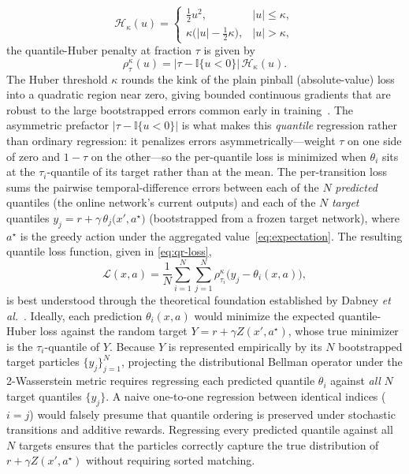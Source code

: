 \documentclass{ieeetmlcn}
\begin{document}
\begin{equation}
\mathcal{H}_\kappa(u) =
\begin{cases}
\tfrac12 u^2, & |u|\le\kappa,\\[2pt]
\kappa\big(|u|-\tfrac12\kappa\big), & |u|>\kappa,
\end{cases}
\end{equation}
the quantile-Huber penalty at fraction $\tau$ is given by
\begin{equation}
\rho^\kappa_\tau(u) = \big|\tau - \mathbb{I}\{u<0\}\big|\,
\mathcal{H}_\kappa(u).
\label{eq:pinball}
\end{equation}
The Huber threshold $\kappa$ rounds the kink of the plain pinball
(absolute-value) loss into a quadratic region near zero, giving bounded
continuous gradients that are robust to the large bootstrapped errors common
early in training~\cite{qrdqn}. The asymmetric prefactor
$|\tau-\mathbb{I}\{u<0\}|$ is what makes this \emph{quantile} regression rather
than ordinary regression: it penalizes errors asymmetrically---weight $\tau$ on
one side of zero and $1-\tau$ on the other---so the per-quantile loss is minimized
when $\theta_i$ sits at the $\tau_i$-quantile of its target rather than at the
mean.
The per-transition loss sums the pairwise temporal-difference errors between
each of the $N$ \emph{predicted} quantiles (the online network's current outputs)
and each of the $N$ \emph{target} quantiles
$y_j = r + \gamma\,\theta_j\!\big(x',a^\star\big)$ (bootstrapped from a frozen
target network), where $a^\star$ is the greedy action under the aggregated value~\eqref{eq:expectation}. The resulting quantile loss function, given in \eqref{eq:qr-loss},
\begin{equation}
\mathcal{L}(x,a) = \frac{1}{N}\sum_{i=1}^{N}\sum_{j=1}^{N}
   \rho^{\kappa}_{\tau_i}\!\big(y_j - \theta_i(x,a)\big),
\label{eq:qr-loss}
\end{equation}
 is best understood through the theoretical foundation established by Dabney \textit{et al.}~\cite{qrdqn}. Ideally, each prediction $\theta_i(x,a)$ would minimize the expected quantile-Huber loss against the random target $Y = r + \gamma Z(x',a^\star)$, whose true minimizer is the $\tau_i$-quantile of $Y$. Because $Y$ is represented empirically by its $N$ bootstrapped target particles $\{y_j\}_{j=1}^N$, projecting the distributional Bellman operator under the 2-Wasserstein metric requires regressing each predicted quantile $\theta_i$ against \emph{all} $N$ target quantiles $\{y_j\}$. A naive one-to-one regression between identical indices ($i=j$) would falsely presume that quantile ordering is preserved under stochastic transitions and additive rewards. Regressing every predicted quantile against all $N$ targets ensures that the particles correctly capture the true distribution of $r + \gamma Z(x', a^\star)$ without requiring sorted matching.
\end{document}
